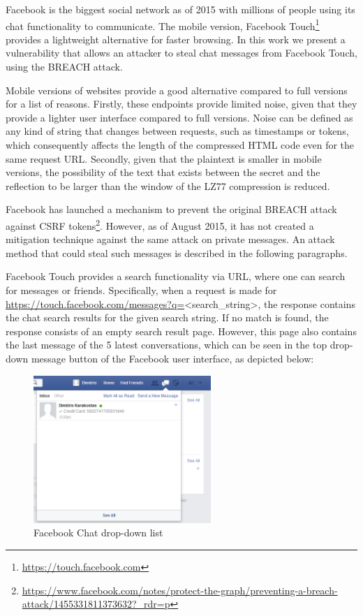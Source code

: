 Facebook is the biggest social network as of 2015 with millions of people using
its chat functionality to communicate. The mobile version, Facebook
Touch\footnote{\url{https://touch.facebook.com}} provides a lightweight
alternative for faster browsing. In this work we present a vulnerability
that allows an attacker to steal chat messages from Facebook Touch, using the
BREACH attack.

Mobile versions of websites provide a good alternative compared to full versions
for a list of reasons. Firstly, these endpoints provide limited noise, given
that they provide a lighter user interface compared to full versions.  Noise
can be defined as any kind of string that changes between requests, such as
timestamps or tokens, which consequently affects the length of the
compressed HTML code even for the same request URL. Secondly, given that the
plaintext is smaller in mobile versions, the possibility of the text that
exists between the secret and the reflection to be larger than the window of
the LZ77 compression is reduced.

Facebook has launched a mechanism to prevent the original BREACH attack against
CSRF
tokens\footnote{\url{https://www.facebook.com/notes/protect-the-graph/preventing-a-breach-attack/1455331811373632?_rdr=p}}.
However, as of August 2015, it has not created a mitigation technique against
the same attack on private messages. An attack method that could steal such
messages is described in the following paragraphs.

Facebook Touch provides a search functionality via URL, where one can search for
messages or friends. Specifically, when a request is made for
\url{https://touch.facebook.com/messages?q=}<search\_string>, the response
contains the chat search results for the given search string. If no match is
found, the response consists of an empty search result page. However, this page
also contains the last message of the 5 latest conversations, which can be seen
in the top drop-down message button of the Facebook user interface, as depicted
below:

\begin{figure}[h] \caption{Facebook Chat drop-down list} \centering
\includegraphics[width=0.6\textwidth]{diagrams/fb_message.png}\end{figure}

